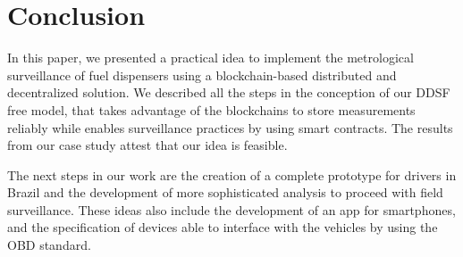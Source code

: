 \documentclass[sigplan]{acmart}
\begin{document}
\section{Conclusion}
In this paper, we presented a practical idea to implement the metrological surveillance of fuel dispensers using a blockchain-based distributed and decentralized solution.
We described all the steps in the conception of our DDSF free model, that takes advantage of the blockchains to store measurements reliably while enables surveillance practices by using smart contracts.
The results from our case study attest that our idea is feasible.


The next steps in our work are the creation of a complete prototype for drivers in Brazil and the development of more sophisticated analysis to proceed with field surveillance.
These ideas also include the development of an app for smartphones, and the specification of devices able to interface with the vehicles by using the OBD standard.


 
\end{document}
